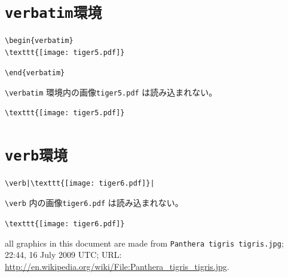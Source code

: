 \documentclass{jsarticle}
\begin{document}
\section{\tt{verbatim}環境}

\begin{verbatim}
\begin{verbatim}
\texttt{[image: tiger5.pdf]}
\end{verbatim}
\verb|\end{verbatim}|

\verb|\verbatim| 環境内の画像\texttt{tiger5.pdf} は読み込まれない。

\begin{verbatim}
\texttt{[image: tiger5.pdf]}
\end{verbatim}

\section{\tt{verb}環境}
\begin{verbatim}
\verb|\texttt{[image: tiger6.pdf]}|
\end{verbatim}

\verb|\verb| 内の画像\texttt{tiger6.pdf} は読み込まれない。

\verb|\texttt{[image: tiger6.pdf]}|

\vspace{4zw}

all graphics in this document are made from \verb|Panthera tigris tigris.jpg|; 22:44, 16 July 2009 UTC; URL: \url{http://en.wikipedia.org/wiki/File:Panthera_tigris_tigris.jpg}.
\end{document}
